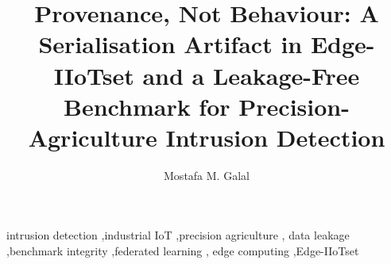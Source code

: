 \documentclass[preprint,11pt]{elsarticle}
\begin{document}
\begin{frontmatter}

\title{Provenance, Not Behaviour: A Serialisation Artifact in Edge-IIoTset and
a Leakage-Free Benchmark for Precision-Agriculture Intrusion Detection}

\author[inst1]{Mostafa M. Galal}


\begin{abstract}

\end{abstract}

\begin{keyword}
intrusion detection \sep industrial IoT \sep precision agriculture \sep
data leakage \sep benchmark integrity \sep federated learning \sep
edge computing \sep Edge-IIoTset
\end{keyword}

\end{frontmatter}





\end{document}
